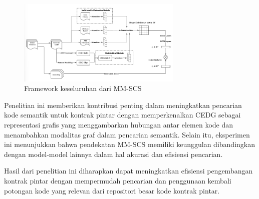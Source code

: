 \begin{figure}[ht]
  \centering
  \includegraphics[width=0.7\textwidth]{resources/chapter-2/framework-mm-scs.png}
  \caption{Framework keseluruhan dari MM-SCS \parencite{shi2021semantic}}
  \label{image:framework-mm-scs}
\end{figure}

Penelitian ini memberikan kontribusi penting dalam meningkatkan pencarian kode semantik untuk kontrak pintar dengan memperkenalkan CEDG sebagai representasi grafis yang menggambarkan hubungan antar elemen kode dan menambahkan modalitas graf dalam pencarian semantik. Selain itu, eksperimen ini menunjukkan bahwa pendekatan MM-SCS memiliki keunggulan dibandingkan dengan model-model lainnya dalam hal akurasi dan efisiensi pencarian.

Hasil dari penelitian ini diharapkan dapat meningkatkan efisiensi pengembangan kontrak pintar dengan mempermudah pencarian dan penggunaan kembali potongan kode yang relevan dari repositori besar kode kontrak pintar.
